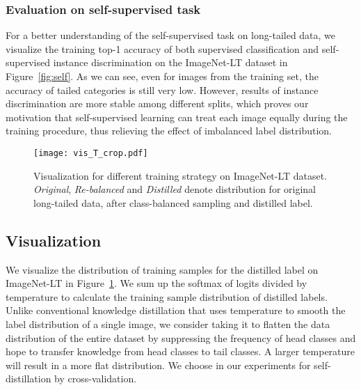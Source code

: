 \documentclass[10pt,twocolumn,letterpaper]{article}
\begin{document}
\subsubsection{Evaluation on self-supervised task}

For a better understanding of the self-supervised task on long-tailed data, we visualize the training top-1 accuracy of both supervised classification and self-supervised instance discrimination on the ImageNet-LT dataset in Figure~\ref{fig:self}. As we can see, even for images from the training set, the accuracy of tailed categories is still very low. However, results of instance discrimination are more stable among different splits, which proves our motivation that self-supervised learning can treat each image equally during the training procedure, thus relieving the effect of imbalanced label distribution.

\begin{figure}[t]
\centering
\texttt{[image: vis\_T\_crop.pdf]}

  \caption{Visualization for different training strategy on ImageNet-LT dataset. \textit{Original}, \textit{Re-balanced} and \textit{Distilled} denote distribution for original long-tailed data, after class-balanced sampling and distilled label.}
  \label{fig:vis}
  \vspace{-3mm}

\end{figure}

\subsection{Visualization}

We visualize the distribution of training samples for the distilled label on ImageNet-LT in Figure~\ref{fig:vis}. We sum up the softmax of logits divided by temperature  to calculate the training sample distribution of distilled labels. Unlike conventional knowledge distillation that uses temperature to smooth the label distribution of a single image, we consider taking it to flatten the data distribution of the entire dataset by suppressing the frequency of head classes  and hope to transfer knowledge from head classes to tail classes. A larger temperature will result in a more flat distribution. We choose  in our experiments for self-distillation by cross-validation.
\end{document}
